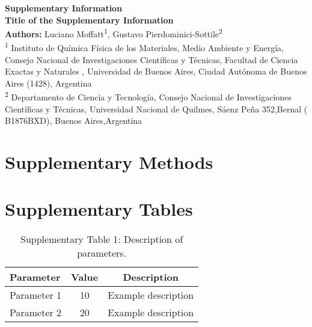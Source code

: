 \documentclass[12pt]{article}
\begin{document}
	
	\begin{center}
		\Large\textbf{Supplementary Information}\\[1em]
		\normalsize
		\textbf{Title of the Supplementary Information}\\[1em]
		\textbf{Authors:} Luciano Moffatt\textsuperscript{1}, Gustavo Pierdominici-Sottile\textsuperscript{2}\\[1em]
		\small
		\textsuperscript{1} Instituto de Qu\'{i}mica F\'{i}sica de los Materiales, Medio Ambiente y Energ\'{i}a, Consejo Nacional de Investigaciones Científicas y T\'{e}cnicas, Facultad de Ciencia Exactas y Naturales , Universidad de Buenos Aires, Ciudad Aut\'{o}noma de Buenos Aires (1428), Argentina\\
		\textsuperscript{2} Departamento de Ciencia y Tecnolog\'{i}a, 
		Consejo Nacional de Investigaciones Científicas y T\'{e}cnicas,  Universidad Nacional de Quilmes, S\'{a}enz Pe\~{n}a 352,Bernal ( B1876BXD), Buenos Aires,Argentina\\
		
	\end{center}
	
	\section*{Supplementary Methods}
	\label{sec:supp-methods}
	\lipsum[1] %
	
	\section*{Supplementary Tables}
	\label{sec:supp-tables}
	\begin{table}[H]
		\centering
		\caption{Supplementary Table 1: Description of parameters.}
		\begin{tabular}{lcc}
			\hline
			Parameter & Value & Description \\
			\hline
			Parameter 1 & 10 & Example description \\
			Parameter 2 & 20 & Example description \\
			\hline
		\end{tabular}
	\end{table}
	
\end{document}
